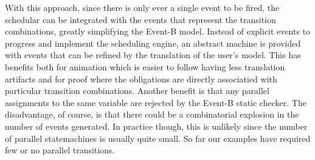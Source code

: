 With this approach, since there is only ever a single event to be fired, the schedular can be integrated with the events that represent the transition combinations, greatly simplifying the Event-B model.
Instead of explicit events to progress and implement the scheduling engine, an abstract machine is provided with events that can be refined by the translation of the user's \SCXML model.
This has benefits both for animation which is easier to follow having less translation artifacts and for proof where the obligations are directly associatied with particular transition combinations. 
Another benefit is that any parallel assignments to the same variable are rejected by the Event-B static checker.
The disadvantage, of course, is that there could be a combinatorial explosion in the number of events generated.
In practice though, this is unlikely since the number of parallel statemachines is usually quite small.
So far our examples have required few or no parallel transitions.


